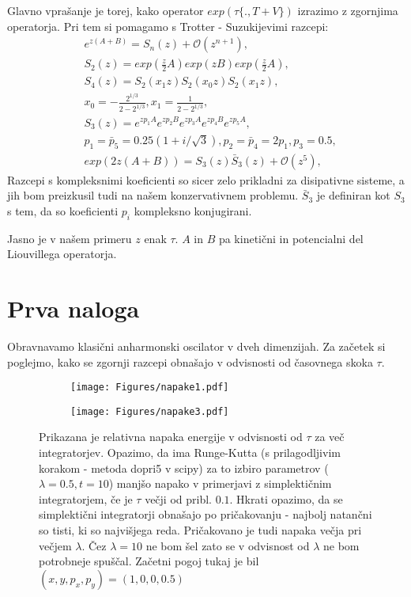 \documentclass{article}
\begin{document}
Glavno vprašanje je torej, kako operator $exp(\tau \{ . , T+V \})$ izrazimo z zgornjima operatorja. Pri tem si pomagamo s Trotter - Suzukijevimi razcepi:
\begin{align*}
&e^{z(A+B)} = S_n(z) + \mathcal{O}(z^{n+1}), \\
& S_2(z) = exp \left( \frac{z}{2}A \right) exp(z B) exp \left( \frac{z}{2}A \right), \\
& S_4(z) = S_2(x_1 z) S_2 (x_0 z) S_2( x_1 z), \\
&x_0 = -\frac{2^{1/3}}{2-2^{1/3}}, x_1 = \frac{1}{2 - 2^{1/3}}, \\
&S_3 (z) = e^{z p_1 A} e^{z p_2 B} e^{z p_3 A}  e^{z p_4 B} e^{zp_5 A}, \\
& p_1 = \bar{p}_5 = 0.25 (1+ i/\sqrt{3}), p_2=\bar{p}_4 = 2p_1 , p_3 = 0.5, \\
&exp(2z (A + B)) = S_3(z) \bar{S}_3(z) + \mathcal{O} (z^5),
\end{align*}
Razcepi s kompleksnimi koeficienti so sicer zelo prikladni za disipativne sisteme, a jih bom preizkusil tudi na našem konzervativnem problemu. $\bar{S}_3$ je definiran kot $S_3$ s tem, da so koeficienti $p_i$ kompleksno konjugirani.

Jasno je v našem primeru $z$ enak $\tau$. $A$ in $B$ pa kinetični in potencialni del Liouvillega operatorja.

\section*{Prva naloga}

Obravnavamo klasični anharmonski oscilator v dveh dimenzijah. Za začetek si poglejmo, kako se zgornji razcepi obnašajo v odvisnosti od časovnega skoka $\tau$. 

\begin{figure}[H]
\centering
\begin{subfigure}{.49\textwidth}
\texttt{[image: Figures/napake1.pdf]}
\end{subfigure}
\begin{subfigure}{.49\textwidth}
\texttt{[image: Figures/napake3.pdf]}
\end{subfigure}
\caption*{Prikazana je relativna napaka energije v odvisnosti od $\tau$ za več integratorjev. Opazimo, da ima Runge-Kutta (s prilagodljivim korakom - metoda dopri5 v scipy) za to izbiro parametrov ($\lambda=0.5, t=10$) manjšo napako v primerjavi z simplektičnim integratorjem, če je $\tau$ večji od pribl. $0.1$. Hkrati opazimo, da se simplektični integratorji obnašajo po pričakovanju - najbolj natančni so tisti, ki so najvišjega reda. Pričakovano je tudi napaka večja pri večjem $\lambda$. Čez $\lambda=10$ ne bom šel zato se v odvisnost od $\lambda$ ne bom potrobneje spuščal. Začetni pogoj tukaj je bil $(x,y,p_x,p_y) = (1,0,0,0.5)$}
\end{figure}
\end{document}
